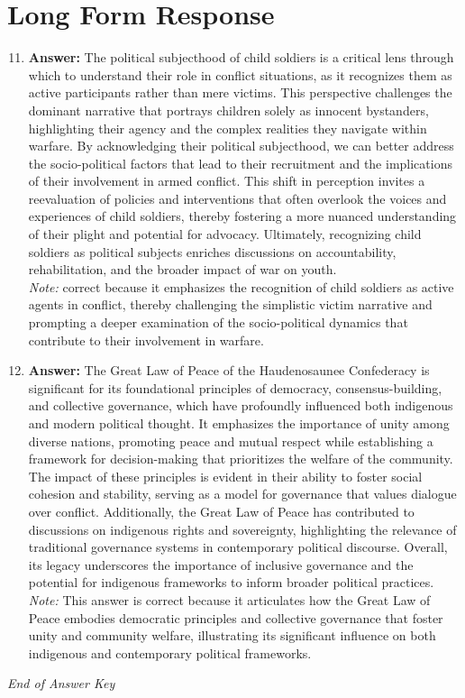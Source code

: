 \documentclass[12pt]{article}
\begin{document}
\section*{Long Form Response}
\begin{enumerate}[label=\arabic*.]
\setcounter{enumi}{10}
\item \textbf{Answer:} The political subjecthood of child soldiers is a critical lens through which to understand their role in conflict situations, as it recognizes them as active participants rather than mere victims. This perspective challenges the dominant narrative that portrays children solely as innocent bystanders, highlighting their agency and the complex realities they navigate within warfare. By acknowledging their political subjecthood, we can better address the socio-political factors that lead to their recruitment and the implications of their involvement in armed conflict. This shift in perception invites a reevaluation of policies and interventions that often overlook the voices and experiences of child soldiers, thereby fostering a more nuanced understanding of their plight and potential for advocacy. Ultimately, recognizing child soldiers as political subjects enriches discussions on accountability, rehabilitation, and the broader impact of war on youth.
\\ \textit{Note:} correct because it emphasizes the recognition of child soldiers as active agents in conflict, thereby challenging the simplistic victim narrative and prompting a deeper examination of the socio-political dynamics that contribute to their involvement in warfare.
\item \textbf{Answer:} The Great Law of Peace of the Haudenosaunee Confederacy is significant for its foundational principles of democracy, consensus-building, and collective governance, which have profoundly influenced both indigenous and modern political thought. It emphasizes the importance of unity among diverse nations, promoting peace and mutual respect while establishing a framework for decision-making that prioritizes the welfare of the community. The impact of these principles is evident in their ability to foster social cohesion and stability, serving as a model for governance that values dialogue over conflict. Additionally, the Great Law of Peace has contributed to discussions on indigenous rights and sovereignty, highlighting the relevance of traditional governance systems in contemporary political discourse. Overall, its legacy underscores the importance of inclusive governance and the potential for indigenous frameworks to inform broader political practices.
\\ \textit{Note:} This answer is correct because it articulates how the Great Law of Peace embodies democratic principles and collective governance that foster unity and community welfare, illustrating its significant influence on both indigenous and contemporary political frameworks.
\end{enumerate}

\vfill
\noindent\textit{End of Answer Key}
\end{document}
